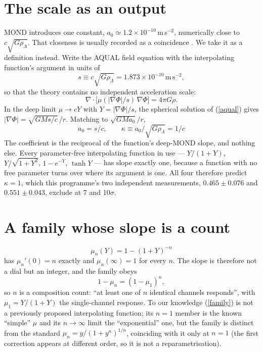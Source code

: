 \documentclass[11pt,letterpaper]{article}
\begin{document}
\section{The scale as an output}
MOND introduces one constant, $a_0\simeq1.2\times10^{-10}\,$m$\,$s$^{-2}$, numerically close to $c\sqrt{G\rho_\Lambda}$. That closeness is usually recorded as a coincidence \cite{fm12}. We take it as a definition instead. Write the AQUAL field equation \cite{bm84} with the interpolating function's argument in units of
\begin{equation}
s \equiv c\sqrt{G\rho_\Lambda}=1.873\times10^{-10}\,\text{m}\,\text{s}^{-2},
\end{equation}
so that the theory contains no independent acceleration scale:
\begin{equation}
\nabla\!\cdot\!\big[\mu(|\nabla\Phi|/s)\,\nabla\Phi\big]=4\pi G\rho .
\label{aqual}
\end{equation}
In the deep limit $\mu\to cY$ with $Y=|\nabla\Phi|/s$, the spherical solution of (\ref{aqual}) gives $|\nabla\Phi|=\sqrt{GMs/c}\,/r$. Matching to $\sqrt{GMa_0}/r$,
\begin{equation}
\boxed{\;a_0=s/c,\qquad \kappa\equiv a_0/\sqrt{G\rho_\Lambda}=1/c\;}
\end{equation}
The coefficient is the reciprocal of the function's deep-MOND slope, and nothing else. Every parameter-free interpolating function in use --- $Y/(1+Y)$, $Y/\sqrt{1+Y^2}$, $1-e^{-Y}$, $\tanh Y$ --- has slope exactly one, because a function with no free parameter turns over where its argument is one. All four therefore predict $\kappa=1$, which this programme's two independent measurements, $0.465\pm0.076$ and $0.551\pm0.043$, exclude at 7 and 10$\sigma$.

\section{A family whose slope is a count}
\begin{equation}
\mu_n(Y)=1-(1+Y)^{-n}
\label{family}
\end{equation}
has $\mu_n'(0)=n$ exactly and $\mu_n(\infty)=1$ for every $n$. The slope is therefore not a dial but an integer, and the family obeys
\begin{equation}
1-\mu_n=(1-\mu_1)^n ,
\end{equation}
so $n$ is a composition count: ``at least one of $n$ identical channels responds'', with $\mu_1=Y/(1+Y)$ the single-channel response. To our knowledge (\ref{family}) is not a previously proposed interpolating function; its $n=1$ member is the known ``simple'' $\mu$ \cite{fb05} and its $n\to\infty$ limit the ``exponential'' one, but the family is distinct from the standard $\mu_n=y/(1+y^n)^{1/n}$, coinciding with it only at $n=1$ (the first correction appears at different order, so it is not a reparametrisation).
\end{document}
